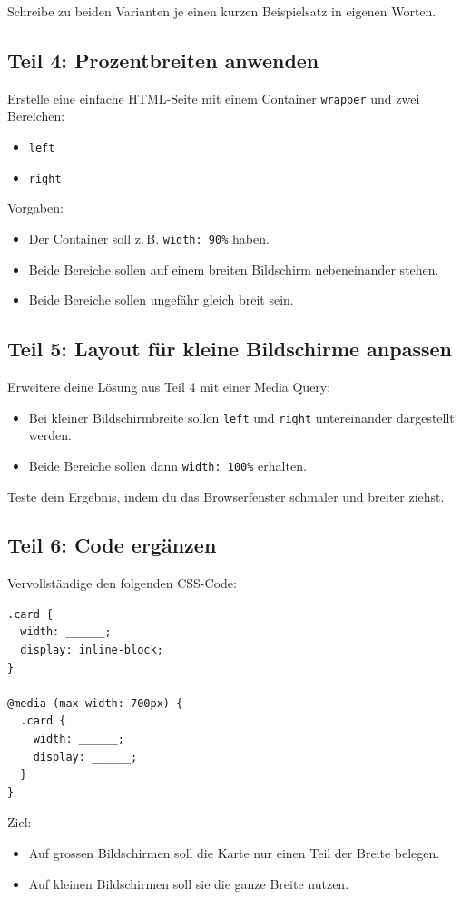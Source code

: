 \documentclass[a4paper,12pt]{article}
\begin{document}
Schreibe zu beiden Varianten je einen kurzen Beispielsatz in eigenen Worten.

\subsection*{Teil 4: Prozentbreiten anwenden}
Erstelle eine einfache HTML-Seite mit einem Container \texttt{wrapper} und zwei Bereichen:
\begin{itemize}
  \item \texttt{left}
  \item \texttt{right}
\end{itemize}

Vorgaben:
\begin{itemize}
  \item Der Container soll z.\,B. \texttt{width: 90\%} haben.
  \item Beide Bereiche sollen auf einem breiten Bildschirm nebeneinander stehen.
  \item Beide Bereiche sollen ungefähr gleich breit sein.
\end{itemize}

\subsection*{Teil 5: Layout für kleine Bildschirme anpassen}
Erweitere deine Lösung aus Teil 4 mit einer Media Query:
\begin{itemize}
  \item Bei kleiner Bildschirmbreite sollen \texttt{left} und \texttt{right} untereinander dargestellt werden.
  \item Beide Bereiche sollen dann \texttt{width: 100\%} erhalten.
\end{itemize}

Teste dein Ergebnis, indem du das Browserfenster schmaler und breiter ziehst.

\subsection*{Teil 6: Code ergänzen}
Vervollständige den folgenden CSS-Code:

\begin{verbatim}
.card {
  width: ______;
  display: inline-block;
}

@media (max-width: 700px) {
  .card {
    width: ______;
    display: ______;
  }
}
\end{verbatim}

Ziel:
\begin{itemize}
  \item Auf grossen Bildschirmen soll die Karte nur einen Teil der Breite belegen.
  \item Auf kleinen Bildschirmen soll sie die ganze Breite nutzen.
\end{itemize}
\end{document}
